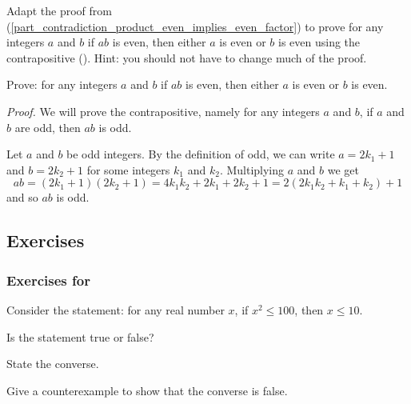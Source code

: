 \begin{exam}
\begin{apart}
        \item Adapt the proof from (\ref{part_contradiction_product_even_implies_even_factor}) to prove for any integers $a$ and $b$ if $ab$ is even, then either $a$ is even or $b$ is even using the contrapositive ().  Hint: you should not have to change much of the proof.
            \begin{soln}
                Prove: for any integers $a$ and $b$ if $ab$ is even, then either $a$ is even or $b$ is even. 
            
                \emph{Proof.}
                We will prove the contrapositive, namely for any integers $a$ and $b$, if $a$ and $b$ are odd, then $ab$ is odd.    

                Let $a$ and $b$ be odd integers.  By the definition of odd, we can write $a = 2k_1+1$ and $b = 2k_2+1$ for some integers $k_1$ and $k_2$.  Multiplying $a$ and $b$ we get $$ ab=(2k_1+1)(2k_2+1)=4k_1k_2+2k_1+2k_2+1 = 2(2k_1k_2 + k_1 + k_2) + 1$$ and so $ab$ is odd.
            
            \end{soln}
    \end{apart}
\end{exam}


\subsection{Exercises}


\subsubsection*{Exercises for  \subconv}

\begin{exer}[\exerP] %
\label{exer_converse_TorF_lessthan}
    Consider the statement: for any real number $x$, if $x^2 \le 100$, then $x \le 10$.
        \begin{exerpart}
            \item Is the statement true or false?
            \item State the converse.
            \item Give a counterexample to show that the converse is false. 
        \end{exerpart}
\end{exer}

